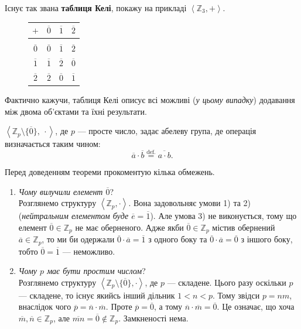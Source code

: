 \documentclass{math_library}
\begin{document}
\begin{example}
Існує так звана \textbf{таблиця Келі}, покажу на прикладі $\left<\mathbb{Z}_3,+ \right>$.
\begin{figure}[H]
\centering
\begin{tabular}{c|ccc}
$+$ & $\overline{0}$ & $\overline{1}$ & $\overline{2}$ \\ 
\hline \\ [-9pt]
$\overline{0}$ & $\overline{0}$ & $\overline{1}$ & $\overline{2}$ \\ 
$\overline{1}$ & $\overline{1}$ & $\overline{2}$ & $\overline{0}$ \\
$\overline{2}$ & $\overline{2}$ & $\overline{0}$ & $\overline{1}$ \\
\end{tabular}
\end{figure}
Фактично кажучи, таблиця Келі описує всі можливі (\textit{у цьому випадку}) додавання між двома об'єктами та їхні результати.
\end{example}

\begin{theorem}
\label{multiplicative_class_of_residues_mod_n_is_a_group}
$\left< \mathbb{Z}_p \setminus \{\overline{0}\},\ \cdot \right>$, де $p$ --- просте число, задає абелеву група, де операція визначається таким чином: \[
\overline{a} \cdot \overline{b} \overset{\text{def.}}{=} \overline{a \cdot b}. \]
\end{theorem}

Перед доведенням теореми прокоментую кілька обмежень.
\begin{enumerate}[wide=0pt,label={\Roman*.}]
\item \textit{Чому вилучили елемент $\overline{0}$}?\\
Розглянемо структуру $\left< \mathbb{Z}_p, \cdot \right>$. Вона задовольняє умови 1) та 2) (\textit{нейтральним елементом буде $\overline{e} = \overline{1}$}). Але умова 3) не виконується, тому що елемент $\overline{0} \in \mathbb{Z}_p$ не має оберненого. Адже якби $\overline{0} \in \mathbb{Z}_p$ містив обернений $\overline{a} \in \mathbb{Z}_p$, то ми би одержали $\overline{0} \cdot \overline{a} = \overline{1}$ з одного боку та $\overline{0} \cdot \overline{a} = \overline{0}$ з іншого боку, тобто $\overline{0} = \overline{1}$ --- неможливо.

\item \textit{Чому $p$ має бути простим числом}?\\
Розглянемо структуру $\left<\mathbb{Z}_p \setminus \{\overline{0}\}, \cdot \right>$, де $p$ --- складене. Цього разу оскільки $p$ --- складене, то існує якийсь інший дільник $1 < n < p$. Тому звідси $p = nm$, внаслідок чого $\overline{p} = \overline{n} \cdot \overline{m}$. Проте $\overline{p} = \overline{0}$, а тому $\overline{n}\cdot \overline{m} = \overline{0}$. Це означає, що хоча $\overline{m}, \overline{n} \in \mathbb{Z}_p$, але $\overline{mn} = \overline{0} \not\in \mathbb{Z}_p$. Замкненості нема.
\end{enumerate}
\end{document}
